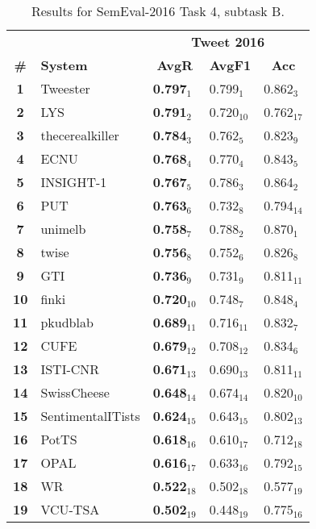 \begin{table*}[tbh]
\centering
\begin{small}
\renewcommand{\arraystretch}{1.0}%
\begin{tabular}{|c|l|l|l|l|}
\hline
 & & \multicolumn{3}{c|}{\bf Tweet 2016} \\
   \bf \# & \bf System & \multicolumn{1}{c}{\bf AvgR} & \multicolumn{1}{c}{\bf AvgF1} & \multicolumn{1}{c|}{\bf Acc} \\
\hline
\bf 1 & Tweester & \bf 0.797$_{1}$ & 0.799$_{1}$ & 0.862$_{3}$ \\
\bf 2 & LYS & \bf 0.791$_{2}$ & 0.720$_{10}$ & 0.762$_{17}$ \\
\bf 3 & thecerealkiller & \bf 0.784$_{3}$ & 0.762$_{5}$ & 0.823$_{9}$ \\
\bf 4 & ECNU & \bf 0.768$_{4}$ & 0.770$_{4}$ & 0.843$_{5}$ \\
\bf 5 & INSIGHT-1 & \bf 0.767$_{5}$ & 0.786$_{3}$ & 0.864$_{2}$ \\
\bf 6 & PUT & \bf 0.763$_{6}$ & 0.732$_{8}$ & 0.794$_{14}$ \\
\bf 7 & unimelb & \bf 0.758$_{7}$ & 0.788$_{2}$ & 0.870$_{1}$ \\
\bf 8 & twise & \bf 0.756$_{8}$ & 0.752$_{6}$ & 0.826$_{8}$ \\
\bf 9 & GTI & \bf 0.736$_{9}$ & 0.731$_{9}$ & 0.811$_{11}$ \\
\bf 10 & finki & \bf 0.720$_{10}$ & 0.748$_{7}$ & 0.848$_{4}$ \\
\bf 11 & pkudblab & \bf 0.689$_{11}$ & 0.716$_{11}$ & 0.832$_{7}$ \\
\bf 12 & CUFE & \bf 0.679$_{12}$ & 0.708$_{12}$ & 0.834$_{6}$ \\
\bf 13 & ISTI-CNR & \bf 0.671$_{13}$ & 0.690$_{13}$ & 0.811$_{11}$ \\
\bf 14 & SwissCheese & \bf 0.648$_{14}$ & 0.674$_{14}$ & 0.820$_{10}$ \\
\bf 15 & SentimentalITists & \bf 0.624$_{15}$ & 0.643$_{15}$ & 0.802$_{13}$ \\
\bf 16 & PotTS & \bf 0.618$_{16}$ & 0.610$_{17}$ & 0.712$_{18}$ \\
\bf 17 & OPAL & \bf 0.616$_{17}$ & 0.633$_{16}$ & 0.792$_{15}$ \\
\bf 18 & WR & \bf 0.522$_{18}$ & 0.502$_{18}$ & 0.577$_{19}$ \\
\bf 19 & VCU-TSA & \bf 0.502$_{19}$ & 0.448$_{19}$ & 0.775$_{16}$ \\
\hline
\end{tabular}
\caption{Results for SemEval-2016 Task 4, subtask B.}
\label{table:results}
\end{small}
\end{table*}
